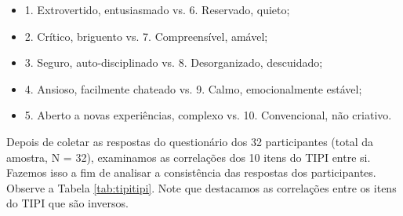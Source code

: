 \begin{itemize}
\item 1. Extrovertido, entusiasmado vs. 6. Reservado, quieto;
\item 2. Crítico, briguento vs. 7. Compreensível, amável;
\item 3. Seguro, auto-disciplinado vs. 8. Desorganizado, descuidado;
\item 4. Ansioso, facilmente chateado vs. 9. Calmo, emocionalmente estável;
\item 5. Aberto a novas experiências, complexo vs. 10. Convencional, não criativo.
\end{itemize}

Depois de coletar as respostas do questionário dos 32 participantes (total da amostra, N = 32),
examinamos as correlações dos 10 itens do TIPI entre si.
Fazemos isso a fim de analisar a consistência das respostas dos participantes. Observe a Tabela \ref{tab:tipitipi}.
Note que destacamos as correlações entre os itens do TIPI que são inversos. 

